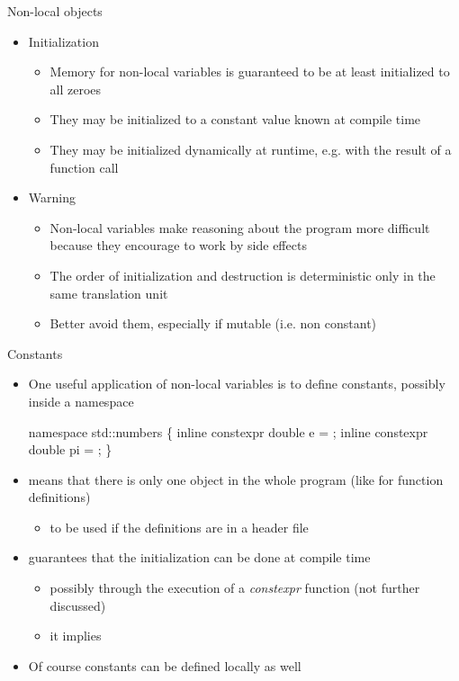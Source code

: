 \begin{frame}[fragile]{Non-local objects \insertcontinuationtext}
  \begin{itemize}
  \item<1-> Initialization
    \begin{itemize}
    \item Memory for non-local variables is guaranteed to be at least
      initialized to all zeroes
    \item They may be initialized to a constant value known at compile time
    \item They may be initialized dynamically at runtime, e.g. with the result
      of a function call
    \end{itemize}
  \item<2-> Warning
    \begin{itemize}
    \item Non-local variables make reasoning about the program more difficult
      because they encourage to work by side effects
    \item The order of initialization and destruction is deterministic only in
      the same translation unit
    \item \alert{Better avoid them}, especially if mutable (i.e. non constant)
    \end{itemize}
  \end{itemize}
\end{frame}

\begin{frame}[fragile]{Constants}

  \begin{itemize}
  \item One useful application of non-local variables is to define constants,
    possibly inside a namespace
    \begin{codeblock}{
namespace std::numbers \{
  inline constexpr double e  = \ddd ;
  inline constexpr double pi = \ddd ;
  \ddd
\}
}\end{codeblock}
    \item<2->  means that there is only one object in the whole
      program (like for function definitions)
      \begin{itemize}
      \item<2-> to be used if the definitions are in a header file
      \end{itemize}
    \item<2->  guarantees that the initialization can be done at
      compile time
    \begin{itemize}
    \item<2-> possibly through the execution of a \textit{constexpr} function
      (not further discussed)
    \item<2-> it implies 
    \end{itemize}
  \item<3->Of course constants can be defined locally as well
  \end{itemize}

\end{frame}

